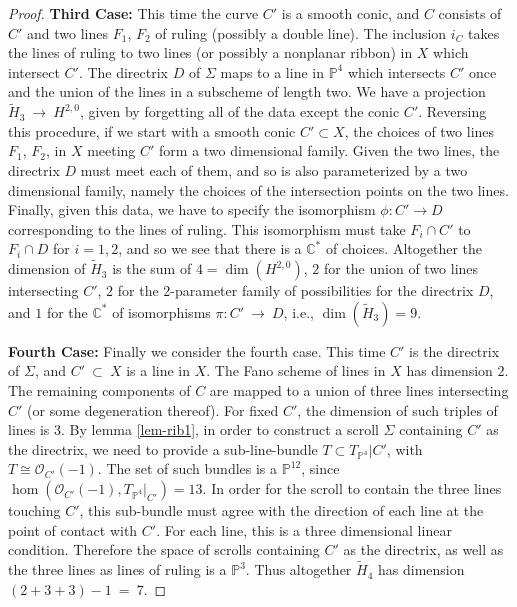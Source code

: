 \documentclass[twoside,12pt,reqno]{amsart}
\theoremstyle{plain}
\theoremstyle{definition}
\newcommand{\CC}{\mathbb{C}}
\newcommand{\PP}{\mathbb{P}}
\def\ps{\vspace{4pt}}
\newcommand{\OO}{\mathcal O}
\begin{document}
\begin{proof}
\textbf{Third Case:}
This time the curve $C'$ is a smooth conic, and $C$ consists of $C'$
and two lines $F_1$, $F_2$ of ruling (possibly a double line).  The inclusion
$i_C$ takes 
the lines of ruling to two lines (or possibly a nonplanar ribbon) in $X$ 
which intersect $C'$.  The directrix $D$ of $\Sigma$ maps to a line in $\PP^4$ which
intersects $C'$ once and the union of the lines in a subscheme of length two.  
We have a projection $\widetilde{H}_3~\rightarrow~ H^{2,0}$, given by forgetting
all of the data except the conic $C'$.  Reversing this procedure, if we start
with a smooth conic $C'\subset X$, the choices of two lines $F_1$, $F_2$, in 
$X$ meeting 
$C'$ form a two dimensional family.  Given the two lines, the directrix $D$
must meet each of them, and so is also parameterized by a two dimensional 
family, namely the choices of the intersection points on the two lines.
Finally, given this data, we have to specify the isomorphism $\phi:C'\rightarrow
D$ corresponding to the lines of ruling.  This isomorphism must take 
$F_i\cap C'$ to $F_i\cap D$ for $i=1,2$, and so we see that there is a 
$\CC^{*}$ of choices.
  Altogether the dimension of $\widetilde{H}_3$
is the sum of $4=\dim (H^{2,0})$, $2$ for the union of two lines
intersecting $C'$, $2$ for the 2-parameter family of possibilities for the
directrix $D$, and $1$ for the $\CC^*$ of isomorphisms $\pi:C'~\rightarrow~ D$,
i.e., $\dim (\widetilde{H}_3) = 9$.  

\ps

\textbf{Fourth Case:}
Finally we consider the fourth case.  This time $C'$ is the directrix 
of $\Sigma$, and $C'~\subset~ X$
is a line in $X$.  The Fano scheme of lines
in $X$ has dimension $2$.  The remaining components of $C$ are mapped
to a union of three lines intersecting $C'$ (or some degeneration
thereof).  For fixed $C'$, the dimension of such triples of lines is
$3$.   By lemma \ref{lem-rib1}, in order to construct a scroll $\Sigma$
containing $C'$ as the directrix, we need to provide a sub-line-bundle
$T\subset T_{\PP^4}|{C'}$, with $T\cong\OO_{C'}(-1)$.  The set of such
bundles is a $\PP^{12}$, since $\hom(\OO_{C'}(-1),T_{\PP^4}|_{C'})=13$.
In order for the scroll to contain the three lines touching $C'$, this
sub-bundle must agree with the direction of each line at the point of contact
with $C'$.  For each line, this is a three dimensional linear condition. 
Therefore the space of scrolls containing $C'$ as the directrix, as well as
the three lines as lines of ruling is a $\PP^3$.
Thus altogether $\widetilde{H}_4$ has dimension $(2+3+3)-1~=~7$.

\ps

\end{proof} 
\end{document}
